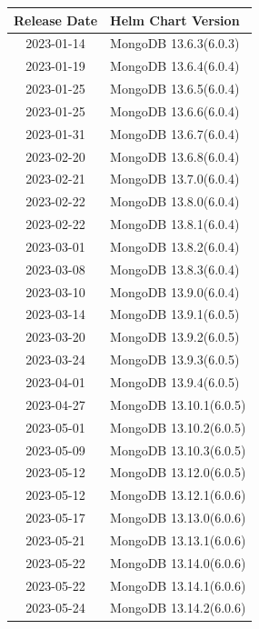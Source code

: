 \documentclass[../main.tex]{subfiles}
\begin{document}
\begin{table}[h]
\centering
\begin{minipage}{0.45\textwidth}
\centering
\begin{tabular}{|c|l|}
\hline
\textbf{Release Date} & \textbf{Helm Chart Version} \\ \hline
    2023-01-14 & MongoDB 13.6.3(6.0.3) \\ \hline
    2023-01-19 & MongoDB 13.6.4(6.0.4) \\ \hline  
    2023-01-25 & MongoDB 13.6.5(6.0.4) \\ \hline
    2023-01-25 & MongoDB 13.6.6(6.0.4) \\ \hline 
    2023-01-31 & MongoDB 13.6.7(6.0.4) \\ \hline 
    2023-02-20 & MongoDB 13.6.8(6.0.4) \\ \hline
    2023-02-21 & MongoDB 13.7.0(6.0.4) \\ \hline
    2023-02-22 & MongoDB 13.8.0(6.0.4) \\ \hline
    2023-02-22 & MongoDB 13.8.1(6.0.4) \\ \hline
    2023-03-01 & MongoDB 13.8.2(6.0.4) \\ \hline 
    2023-03-08 & MongoDB 13.8.3(6.0.4) \\ \hline 
    2023-03-10 & MongoDB 13.9.0(6.0.4) \\ \hline 
    2023-03-14 & MongoDB 13.9.1(6.0.5) \\ \hline  
    2023-03-20 & MongoDB 13.9.2(6.0.5)\\ \hline  
    2023-03-24 & MongoDB 13.9.3(6.0.5) \\ \hline
    2023-04-01 & MongoDB 13.9.4(6.0.5) \\ \hline  
    2023-04-27 & MongoDB 13.10.1(6.0.5) \\ \hline
    2023-05-01 & MongoDB 13.10.2(6.0.5) \\ \hline
    2023-05-09 & MongoDB 13.10.3(6.0.5) \\ \hline
    2023-05-12 & MongoDB 13.12.0(6.0.5) \\ \hline
    2023-05-12 & MongoDB 13.12.1(6.0.6) \\ \hline  
    2023-05-17 & MongoDB 13.13.0(6.0.6) \\ \hline  
    2023-05-21 & MongoDB 13.13.1(6.0.6) \\ \hline  
    2023-05-22 & MongoDB 13.14.0(6.0.6) \\ \hline 
    2023-05-22 & MongoDB 13.14.1(6.0.6) \\ \hline  
    2023-05-24 & MongoDB 13.14.2(6.0.6) \\ \hline  

\end{tabular}
\end{minipage}
\end{table}
\end{document}
